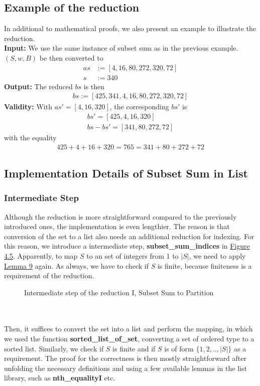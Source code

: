 \subsection{Example of the reduction}
In additional to mathematical proofs, we also present an example to illustrate the reduction.\\
\textbf{Input:} We use the same instance of subset sum as in the previous example. $(S, w, B)$ be 
then converted to 
\begin{align*}
    as &:= [4, 16, 80, 272, 320, 72] \\ 
    s &:= 340
\end{align*}
\textbf{Output:} The reduced $bs$ is then 
\begin{align*}
    bs := [425, 341, 4, 16, 80, 272, 320, 72]
\end{align*}
\textbf{Validity:} With $as' = [4, 16, 320]$, the corresponding $bs'$ is 
\begin{align*}
    bs' = [425, 4, 16, 320] \\ 
    bs - bs' = [341, 80, 272, 72]
\end{align*}
with the equality
\begin{align*}
    425 + 4 + 16 + 320 = 765 = 341 + 80 + 272 + 72 
\end{align*}

\subsection{Implementation Details of Subset Sum in List}
\subsubsection*{Intermediate Step}
Although the reduction is more straightforward compared to the previously introduced ones, the implementation is even lengthier. 
The reason is that conversion of the set to a list also needs an additional reduction for indexing. For this reason, we introduce 
a intermediate step, \textbf{subset\_sum\_indices} in \hyperref[fig:4.5]{Figure 4.5}.
Apparently, to map $S$ to an set of integers from 1 to $|S|$, we need to apply \hyperref[lemma:9]{Lemma 9} again. 
As always, we have to check if $S$ is finite, because finiteness is a requirement of the reduction.
\begin{figure}[!h]
    \caption{Intermediate step of the reduction I, Subset Sum to Partition}
    \label{fig:4.6}
\end{figure}\\\\
Then, it suffices to convert the set into a list and perform the mapping, in which we used the function 
\textbf{sorted\_list\_of\_set}, converting a set of ordered type to a sorted list. Similarly, we check if 
$S$ is finite and if $S$ is of form $\{1, 2, .. , |S|\}$ as a requirement. The proof for the correctness is then mostly straightforward
after unfolding the necessary definitions and using a few available lemmas in the list library, such as \textbf{nth\_equalityI} etc. 

